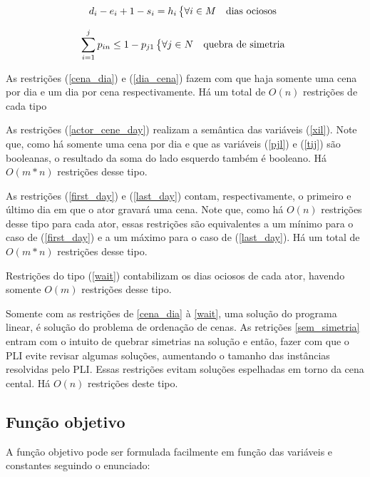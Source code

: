 \documentclass[a4paper,11pt]{article}
\begin{document}
\begin{equation}
  d_{i} - e_i + 1 - s_i = h_i \begin{dcases*} \forall i \in M & dias ociosos \end{dcases*}
  \label{wait}
\end{equation}

\begin{equation}
  \sum_{i=1}^j p_{in} \leq 1 - p_{j1} \begin{dcases*} \forall j \in N & quebra de simetria \end{dcases*}
  \label{sem_simetria}
\end{equation}

As restrições (\ref{cena_dia}) e (\ref{dia_cena}) fazem com que haja somente uma
cena por dia e um dia por cena respectivamente. Há um total de $O(n)$ restrições
de cada tipo

As restrições (\ref{actor_cene_day}) realizam a semântica das variáveis (\ref{xil}).
Note que, como há somente uma cena por dia e que as variáveis (\ref{pjl}) e (\ref{tij})
são booleanas, o resultado da soma do lado esquerdo também é booleano. Há $O(m*n)$
restrições desse tipo.

As restrições (\ref{first_day}) e (\ref{last_day}) contam, respectivamente, o
primeiro e último dia em que o ator gravará uma cena. Note que, como há $O(n)$
restrições desse tipo para cada ator, essas restrições são equivalentes a um
mínimo para o caso de (\ref{first_day}) e a um máximo para o caso de (\ref{last_day}).
Há um total de $O(m*n)$ restrições desse tipo.

Restrições do tipo (\ref{wait}) contabilizam os dias ociosos de cada ator, havendo
somente $O(m)$ restrições desse tipo.

Somente com as restrições de \ref{cena_dia} à \ref{wait}, uma solução do programa
linear, é solução do problema de ordenação de cenas. As retrições \ref{sem_simetria}
entram com o intuito de quebrar simetrias na solução e então, fazer com que o PLI
evite revisar algumas soluções, aumentando o tamanho das instâncias resolvidas pelo PLI.
Essas restrições evitam soluções espelhadas em torno da cena cental. Há $O(n)$ restrições
deste tipo.

\subsection{Função objetivo}
A função objetivo pode ser formulada facilmente em função das variáveis e constantes
seguindo o enunciado:
\end{document}

